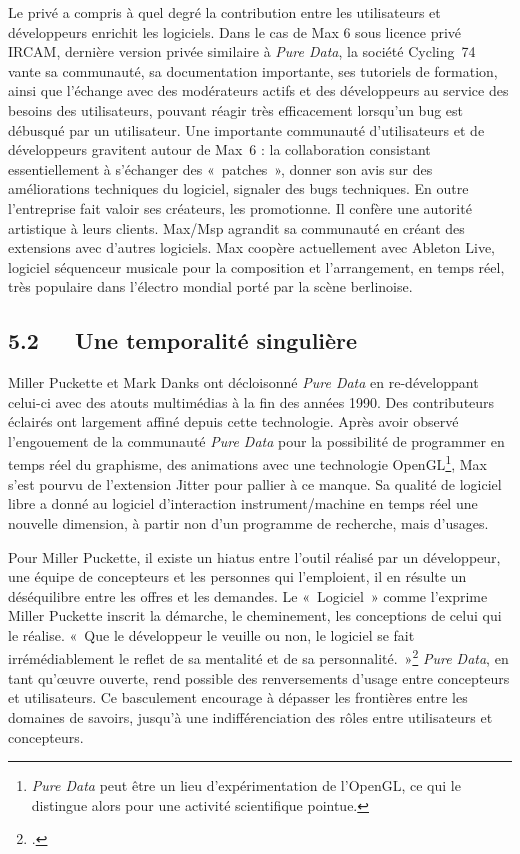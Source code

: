 \documentclass{FramateX}
\begin{document}
\begin{refsection}
Le privé a compris à quel degré la contribution entre les utilisateurs
et développeurs enrichit les logiciels. Dans le cas de Max 6 sous
licence privé IRCAM, dernière version privée similaire à \textit{Pure Data}, la
société Cycling~74 vante sa communauté, sa documentation importante,
ses tutoriels de formation, ainsi que l'échange avec des modérateurs
actifs et des développeurs au service des besoins des utilisateurs,
pouvant réagir très efficacement lorsqu'un bug est débusqué par un
utilisateur. Une importante communauté d'utilisateurs
et de développeurs gravitent autour de Max~6 : la collaboration
consistant essentiellement à s'échanger des
«~patches~», donner son avis sur des améliorations techniques du
logiciel, signaler des bugs techniques. En outre l'entreprise fait
valoir ses créateurs, les promotionne. Il confère une autorité
artistique à leurs clients. Max/Msp agrandit sa communauté en créant
des extensions avec d'autres logiciels. Max coopère actuellement avec
Ableton Live, logiciel séquenceur musicale pour la composition et
l'arrangement, en temps réel, très populaire dans l'électro mondial
porté par la scène berlinoise.




\subsection*{5.2~~~Une temporalité singulière}
{}

Miller Puckette et Mark Danks ont décloisonné \textit{Pure Data} en re-développant
celui-ci avec des atouts multimédias à la fin des années 1990. Des
contributeurs éclairés ont largement affiné depuis cette technologie.
Après avoir observé l'engouement de la communauté \textit{Pure Data} pour la
possibilité de programmer en temps réel du graphisme, des animations
avec une technologie OpenGL\footnote{\textit{Pure Data} peut être un lieu
d'expérimentation de l'OpenGL, ce qui le distingue alors pour une
activité scientifique pointue.}, Max s'est pourvu de l'extension Jitter
pour pallier à ce manque. Sa qualité de logiciel libre a donné au
logiciel d'interaction instrument/machine en temps réel une nouvelle
dimension, à partir non d'un programme de recherche, mais d'usages. 

Pour Miller Puckette, il existe un hiatus entre l'outil réalisé par un
développeur, une équipe de concepteurs et les personnes qui
l'emploient, il en résulte un déséquilibre entre les offres et les
demandes. Le «~Logiciel~» comme l'exprime Miller Puckette inscrit la
démarche, le cheminement, les conceptions de celui qui le réalise.
«~Que le développeur le veuille ou non, le logiciel se fait
irrémédiablement le reflet de sa mentalité et de sa
personnalité.~»\footnote{\cite[p.~182]{Puckette2011}.} \textit{Pure Data}, en tant qu'œuvre ouverte, rend possible
des renversements d'usage entre concepteurs et utilisateurs. Ce
basculement encourage à dépasser les frontières entre les domaines de
savoirs, jusqu'à une indifférenciation des rôles entre utilisateurs et
concepteurs.



\end{refsection}
\end{document}
